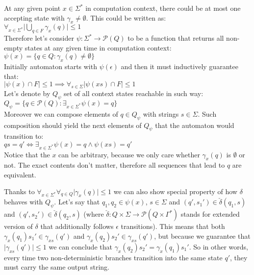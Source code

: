 \documentclass[12pt]{article}
\begin{document}
\begin{enumerate}
At any given point $x \in \Sigma^*$ in computation context, there could be at most one accepting state with $\gamma_x \ne \emptyset$. This could be written as: \\
$\forall_{x\in\Sigma^*} \vert \bigcup_{q\in F} \gamma_x(q) \vert \le 1$ \\
Therefore let's consider $\psi : \Sigma^* \rightarrow \mathcal{P}(Q)$ to be a function that returns all non-empty states at any given time in computation context: \\
$\psi(x) = \{q \in Q : \gamma_x(q) \ne \emptyset \}$ \\
Initially automaton starts with $\psi(\epsilon)$ and then it must inductively guarantee that: \\
$\vert \psi(x) \cap F \vert \le 1 \implies  \forall_{s\in\Sigma}  \vert \psi(xs) \cap F \vert \le 1$ \\
Let's denote by $Q_\psi$ set of all context states reachable in such way: \\
$Q_\psi = \{ q \in \mathcal{P}(Q) : \exists_{x\in\Sigma^*} \psi(x)=q \}$ \\
Moreover we can compose elements of $q \in Q_\psi$ with strings $s\in\Sigma$. Such composition should yield the next elements of $Q_\psi$ that the automaton would transition to: \\
$qs = q' \iff   \exists_{x\in\Sigma^*} \psi(x)=q \wedge \psi(xs)=q' $  \\
Notice that the $x$ can be arbitrary, because we only care whether $\gamma_x(q)$ is $\emptyset$ or not. The exact contents don't matter, therefore all sequences that lead to $q$ are equivalent.


Thanks to $\forall_{x\in\Sigma^*} \forall_{q\in Q} \vert \gamma_x(q) \vert \le 1$ we can also show special property of how $\delta$ behaves with $Q_\psi$. Let's say that $q_1,q_2 \in  \psi(x)$, $s \in \Sigma$ and $(q',s_1') \in \check{\delta}(q_1,s)$ and $(q',s_2') \in \check{\delta}(q_2,s)$ (where $\check{\delta} : Q \times \Sigma \rightarrow \mathcal{P}(Q \times \Gamma^*)$ stands for extended version of $\delta$ that additionally follows  $\epsilon$ transitions). This means that both $\gamma_x(q_1)s_1' \in \gamma_{xs}(q') $ and $\gamma_x(q_2)s_2' \in \gamma_{xs}(q') $, but because we guarantee that $\vert \gamma_{xs}(q')\vert \le 1$ we can conclude that $\gamma_x(q_2)s_2' = \gamma_x(q_1)s_1'$. So in other words, every time two non-deterministic branches transition into the same state $q'$, they must carry the same output string.


\end{enumerate}
\end{document}
